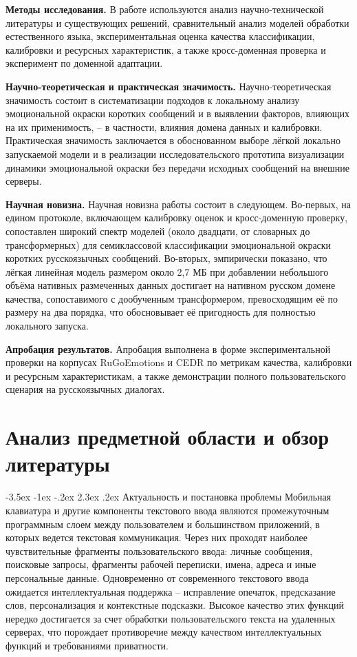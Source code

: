 \documentclass[12pt,a4paper]{report}
\makeatletter
\renewcommand{\section}{\@startsection{section}{1}{\z@}%
  {-3.5ex \@plus -1ex \@minus -.2ex}%
  {2.3ex \@plus .2ex}%
  {\normalfont\large\bfseries\centering}}
\makeatother
\begin{document}
\textbf{Методы исследования.}
В работе используются анализ научно-технической литературы и существующих решений, сравнительный анализ моделей обработки естественного языка, экспериментальная оценка качества классификации, калибровки и ресурсных характеристик, а также кросс-доменная проверка и эксперимент по доменной адаптации.

\textbf{Научно-теоретическая и практическая значимость.}
Научно-теоретическая значимость состоит в систематизации подходов к локальному анализу эмоциональной окраски коротких сообщений и в выявлении факторов, влияющих на их применимость, -- в частности, влияния домена данных и калибровки. Практическая значимость заключается в обоснованном выборе лёгкой локально запускаемой модели и в реализации исследовательского прототипа визуализации динамики эмоциональной окраски без передачи исходных сообщений на внешние серверы.

\textbf{Научная новизна.}
Научная новизна работы состоит в следующем. Во-первых, на едином протоколе, включающем калибровку оценок и кросс-доменную проверку, сопоставлен широкий спектр моделей (около двадцати, от словарных до трансформерных) для семиклассовой классификации эмоциональной окраски коротких русскоязычных сообщений. Во-вторых, эмпирически показано, что лёгкая линейная модель размером около 2,7 МБ при добавлении небольшого объёма нативных размеченных данных достигает на нативном русском домене качества, сопоставимого с дообученным трансформером, превосходящим её по размеру на два порядка, что обосновывает её пригодность для полностью локального запуска.

\textbf{Апробация результатов.}
Апробация выполнена в форме экспериментальной проверки на корпусах RuGoEmotions и CEDR по метрикам качества, калибровки и ресурсным характеристикам, а также демонстрации полного пользовательского сценария на русскоязычных диалогах.

\chapter{Анализ предметной области и обзор литературы}

\section{Актуальность и постановка проблемы}
Мобильная клавиатура и другие компоненты текстового ввода являются промежуточным программным слоем между пользователем и большинством приложений, в которых ведется текстовая коммуникация. Через них проходят наиболее чувствительные фрагменты пользовательского ввода: личные сообщения, поисковые запросы, фрагменты рабочей переписки, имена, адреса и иные персональные данные. Одновременно от современного текстового ввода ожидается интеллектуальная поддержка -- исправление опечаток, предсказание слов, персонализация и контекстные подсказки. Высокое качество этих функций нередко достигается за счет обработки пользовательского текста на удаленных серверах, что порождает противоречие между качеством интеллектуальных функций и требованиями приватности.
\end{document}
